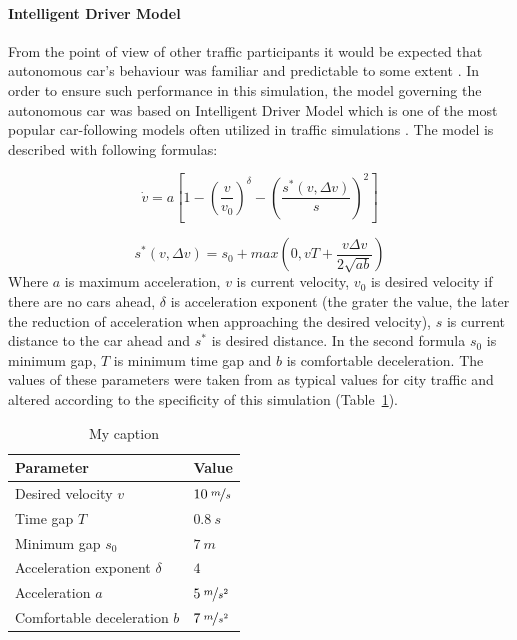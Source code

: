\documentclass[11pt,english]{article}
\begin{document}
\paragraph{Intelligent Driver Model}
From the point of view of other traffic participants it would be expected that autonomous car's behaviour was familiar and predictable to some extent \citep{sivak2015road}. In order to ensure such performance in this simulation, the model governing the autonomous car was based on Intelligent Driver Model which is one of the most popular car-following models often utilized in traffic simulations \citep{treiber2013traffic}. The model is described with following formulas:

\begin{equation}
\dot{v}=a\left[1-\left(\frac{v}{v_0}\right)^{\delta}-\left(\frac{s^{*}\left ( v,\Delta v \right )}{s}\right)^{2}\right]
\end{equation}

\begin{equation}
s^{*}\left ( v,\Delta v \right )=s_0+max\left ( 0,vT+\frac{v\Delta v}{2 \sqrt{ab}} \right )
\end{equation}
Where $a$ is maximum acceleration, $v$ is current velocity, $v_0$ is desired velocity if there are no cars ahead, $\delta$ is acceleration exponent (the grater the value, the later the reduction of acceleration when approaching  the desired velocity), $s$ is current distance to the car ahead and  $s^{*}$ is desired distance.
In the second formula $s_0$ is minimum gap, $T$ is minimum time gap and $b$ is comfortable deceleration. The values of these parameters were taken from \citet{sivak2015road} as typical values for city traffic and altered according to the specificity of this simulation (Table~\ref{table:idm}).


\begin{table}[!]
\centering
\begin{tabular}{|p{7cm}|p{3cm}|}
\hline
\textbf{Parameter}          & \textbf{Value} \\ \hline
Desired velocity $v$          & $10\:\nicefrac{m}{s}$         \\ \hline
Time gap $T$                  & $0.8\:s$          \\ \hline
Minimum gap $s_0$            & $7\:m$            \\ \hline
Acceleration exponent $\delta$ & $4$              \\ \hline
Acceleration $a$              & $5\:\nicefrac{m}{s^2}$         \\ \hline
Comfortable deceleration $b$  & $7\:\nicefrac{m}{s^2}$         \\ \hline
\end{tabular}
\caption{My caption}
\label{table:idm}
\end{table}
\end{document}
